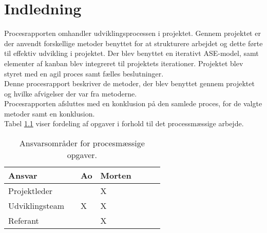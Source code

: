 \chapter{Indledning}
Procesrapporten omhandler udviklingsprocessen i projektet. Gennem projektet er der anvendt
forskellige metoder benyttet for at strukturere arbejdet og dette førte til effektiv
udvikling i projektet.
Der blev benyttet en iterativt ASE-model, samt elementer af kanban blev integreret til projektets iterationer.
Projektet blev styret med en agil proces samt fælles beslutninger. \\
Denne procesrapport beskriver de metoder, der blev benyttet gennem
projektet og hvilke afvigelser der var fra metoderne. \\ 
Procesrapporten afsluttes med en konklusion på den samlede proces, for de valgte metoder samt en konklusion. \\
Tabel \ref{ProcessTabel} viser fordeling af opgaver i forhold til det processmæssige arbejde.

\begin{table}[H]
	\centering
	\begin{tabular}{lllllll} \hline
		\textbf{Ansvar} &  & \textbf{Ao}&  \textbf{Morten}&   \\ \hline
		Projektleder&  &  &  X&  \\ \hline
		Udviklingsteam& & X& X& \\  \hline
		Referant& & & X& \\ \hline
	\end{tabular}
	\caption{Ansvarsområder for procesmæssige opgaver.}
	\label{ProcessTabel}
\end{table}